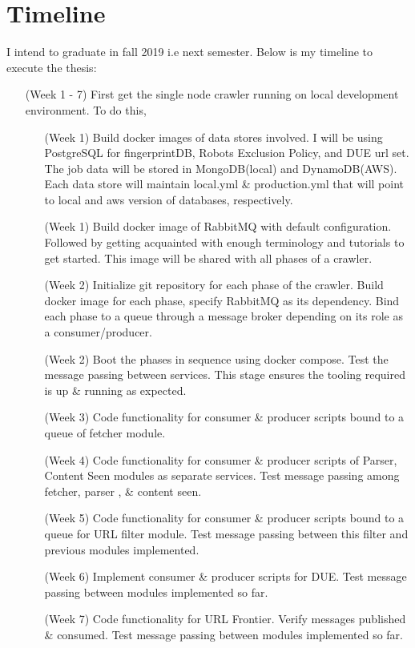 \chapter{Timeline}
I intend to graduate in fall 2019 i.e next semester. Below is my timeline to execute the thesis:
\begin{itemize}
\item[(Week 1 - 7)] First get the single node crawler running on local development environment. To do this,
  \begin{itemize}
  \item[(Week 1)] Build docker images of data stores involved. I will be using PostgreSQL for
    fingerprintDB, Robots Exclusion Policy, and DUE url set. The job data will be stored in MongoDB(local)
    and DynamoDB(AWS). Each data store will maintain local.yml
    \& production.yml that will point to local and aws version of databases, respectively.
  \item[(Week 1)] Build docker image of RabbitMQ with default configuration. Followed by getting acquainted with enough terminology and tutorials to get started. This image will be shared with all phases of a
    crawler.
  \item [(Week 2)]Initialize git repository for each phase of the crawler. Build docker image for each phase,
    specify RabbitMQ as its dependency. Bind each phase to a queue through a message broker depending
    on its role as a consumer/producer.
  \item[(Week 2)] Boot the phases in sequence using docker compose. Test the message passing between services.
    This stage ensures the tooling required is up \& running as expected.
  \item[(Week 3)] Code functionality for consumer \& producer scripts bound to a queue of fetcher module. 
  \item[(Week 4)] Code functionality for consumer \& producer scripts of Parser, Content Seen modules as separate
    services. Test message passing among fetcher, parser , \& content seen.
  \item[(Week 5)] Code functionality for consumer \& producer scripts bound to a queue for URL filter module. Test
    message passing between this filter and previous modules implemented.
  \item[(Week 6)] Implement consumer \& producer scripts for DUE. Test message passing between modules implemented
    so far.
  \item[(Week 7)] Code functionality for URL Frontier. Verify messages published \& consumed. Test message passing between modules implemented so far.

\end{itemize}
\end{itemize}
